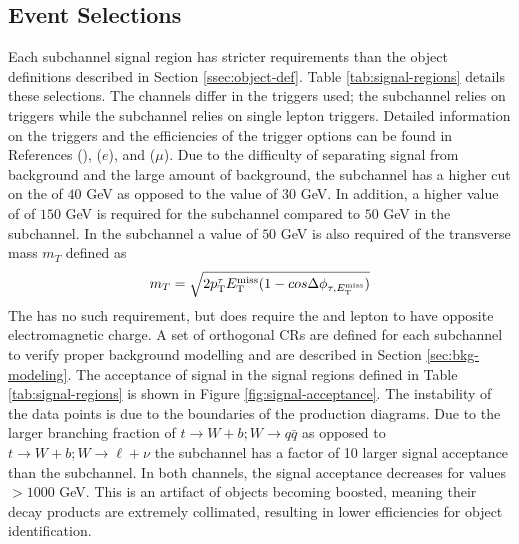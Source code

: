 		\subsection{Event Selections}\label{ssec:event-selection}
			Each subchannel signal region has stricter requirements than the object definitions described in Section \ref{ssec:object-def}. Table \ref{tab:signal-regions} details these selections. The channels differ in the triggers used; the \taujets subchannel relies on \Etm triggers while the \taulep subchannel relies on single lepton triggers. Detailed information on the triggers and the efficiencies of the trigger options can be found in References \cite{MET-Trigger} (\Etm), \cite{Electron-Trigger} ($e$), and \cite{Muon-Trigger} ($\mu$).  Due to the difficulty of separating signal from background and the large amount of background, the \taujets subchannel has a higher \pt cut on the \tauhad of $40$ GeV as opposed to the \taulep value of $30$ GeV. In addition, a higher value of \Etm of $150$ GeV is required for the \taujets subchannel compared to $50$ GeV in the \taulep subchannel. In the \taujets subchannel a value of $50$ GeV is also required of the transverse mass $m_{T}$ defined as 
			\begin{equation}\label{eqn:transverse-mass}
			m_{T} = \sqrt{ 2 p_{\text{T}}^{\tau} E_\text{T}^\text{miss} (1 - cos \Delta \phi_{\tau,E_\text{T}^\text{miss}}) }
			\end{equation}
			The \taulep has no such requirement, but does require the \tauhad and lepton to have opposite electromagnetic charge. A set of orthogonal \glspl{CR} are defined for each subchannel to verify proper background modelling and are described in Section \ref{sec:bkg-modeling}. The acceptance of signal in the signal regions defined in Table \ref{tab:signal-regions} is shown in Figure \ref{fig:signal-acceptance}. The instability of the data points is due to the boundaries of the \Hpm production diagrams.  Due to the larger branching fraction of $t \to W+b;  W \to q\bar{q}$ as opposed to $t \to W+b; W \to \ell + \nu$ the \taujets subchannel has a factor of 10 larger signal acceptance than the \taulep subchannel. In both channels, the signal acceptance decreases for \mHpm values $> 1000$ GeV. This is an artifact of objects becoming boosted, meaning their decay products are extremely collimated, resulting in lower efficiencies for object identification.

